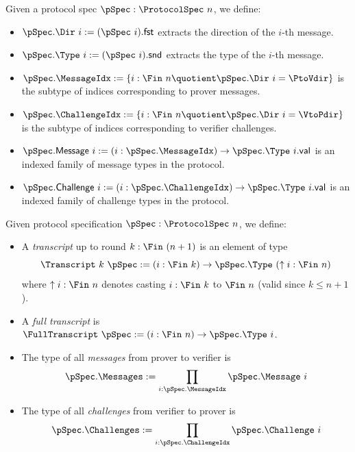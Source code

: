 \begin{definition}
    \label{def:protocol_spec_components}
    Given a protocol spec $\pSpec : \ProtocolSpec\ n$, we define:
    \begin{itemize}
        \item $\pSpec.\Dir\ i := (\pSpec\ i).\mathsf{fst}$ extracts the direction of the $i$-th message.
        \item $\pSpec.\Type\ i := (\pSpec\ i).\mathsf{snd}$ extracts the type of the $i$-th message.
        \item $\pSpec.\MessageIdx := \{i : \Fin\ n \quotient \pSpec.\Dir\ i = \PtoVdir\}$ is the subtype of indices corresponding to prover messages.
        \item $\pSpec.\ChallengeIdx := \{i : \Fin\ n \quotient \pSpec.\Dir\ i = \VtoPdir\}$ is the subtype of indices corresponding to verifier challenges.
        \item $\pSpec.\mathsf{Message}\ i := (i : \pSpec.\MessageIdx) \to \pSpec.\Type\ i.\mathsf{val}$ is an indexed family of message types in the protocol.
        \item $\pSpec.\mathsf{Challenge}\ i := (i : \pSpec.\ChallengeIdx) \to \pSpec.\Type\ i.\mathsf{val}$ is an indexed family of challenge types in the protocol.
    \end{itemize}
\end{definition}

\begin{definition}
    \label{def:transcript}
        Given protocol specification $\pSpec : \ProtocolSpec\ n$, we define:
    \begin{itemize}
        \item A \emph{transcript} up to round $k : \Fin\ (n + 1)$ is an element of type
                \[ \Transcript\ k\ \pSpec := (i : \Fin\ k) \to \pSpec.\Type\ (\uparrow i : \Fin\ n) \]
        where $\uparrow i : \Fin\ n$ denotes casting $i : \Fin\ k$ to $\Fin\ n$ (valid since $k \leq n + 1$).

        \item A \emph{full transcript} is $\FullTranscript\ \pSpec := (i : \Fin\ n) \to \pSpec.\Type\ i$.

        \item The type of all \emph{messages} from prover to verifier is
        \[ \pSpec.\Messages := \prod_{i : \pSpec.\MessageIdx} \pSpec.\Message\ i \]

        \item The type of all \emph{challenges} from verifier to prover is
        \[ \pSpec.\Challenges := \prod_{i : \pSpec.\ChallengeIdx} \pSpec.\Challenge\ i \]
    \end{itemize}
\end{definition}

